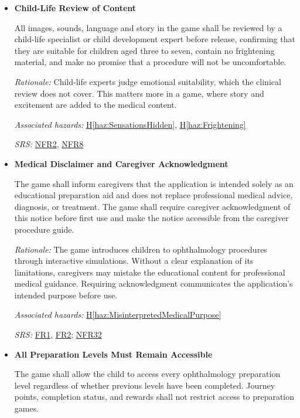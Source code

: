 \documentclass{article}
\newcounter{hazard}
\newcommand{\hazref}[1]{\hyperref[haz:#1]{H\ref*{haz:#1}}}
\newcounter{sr}
\newcommand{\srdef}[1]{\refstepcounter{sr}\label{sr:#1}\textbf{SR-\thesr:}}
\newcommand{\srsurl}{https://team-hindsight.github.io/ophthamology-game/SRS/SRS.pdf}
\newcommand{\srsfrref}[2]{\href{\srsurl\#nameddest=#1}{FR#2}}
\newcommand{\srsnfrref}[2]{\href{\srsurl\#nameddest=#1}{NFR#2}}
\begin{document}
\begin{itemize}[leftmargin=1.5cm, labelwidth=1.3cm, labelsep=0.2cm,
  align=left, itemsep=1.2em, parsep=0.6em]
\textit{Associated hazards:} \hazref{SensationsHidden}

\textit{SRS:} \srsfrref{FR_DescribeSensations}{7}; \srsnfrref{NFR_ChildSafe}{2}

\item[\srdef{ChildLifeReview}] \textbf{Child-Life Review of Content}

All images, sounds, language and story in the game shall be reviewed by a
child-life specialist or child development expert before release, confirming
that they are suitable for children aged three to seven, contain no
frightening material, and make no promise that a procedure will not be
uncomfortable.

\textit{Rationale:} Child-life experts judge emotional suitability, which the
clinical review does not cover. This matters more in a game, where story and
excitement are added to the medical content.

\textit{Associated hazards:} \hazref{SensationsHidden}, \hazref{Frightening}

\textit{SRS:} \srsnfrref{NFR_ChildSafe}{2}, \srsnfrref{NFR_Language}{8}

\item[\srdef{MedicalDisclaimer}]
\textbf{Medical Disclaimer and Caregiver Acknowledgment}

The game shall inform caregivers that the
application is intended solely as an educational
preparation aid and does not replace professional
medical advice, diagnosis, or treatment.
The game shall require caregiver acknowledgment
of this notice before first use and make the
notice accessible from the caregiver procedure guide.

\textit{Rationale:}
The game introduces children to ophthalmology
procedures through interactive simulations.
Without a clear explanation of its limitations,
caregivers may mistake the educational content
for professional medical guidance. Requiring
acknowledgment communicates the application's
intended purpose before use.

\textit{Associated hazards:}
\hazref{MisinterpretedMedicalPurpose}

\textit{SRS:} \srsfrref{FR_MedicalNotice}{1}, \srsfrref{FR_RecordAck}{2}; \srsnfrref{NFR_NoClaims}{32}

\item[\srdef{AllLevelsAccessible}]
\textbf{All Preparation Levels Must Remain Accessible}

The game shall allow the child to access every
ophthalmology preparation level regardless of
whether previous levels have been completed.
Journey points, completion status, and rewards
shall not restrict access to preparation games.


\end{itemize}
\end{document}
